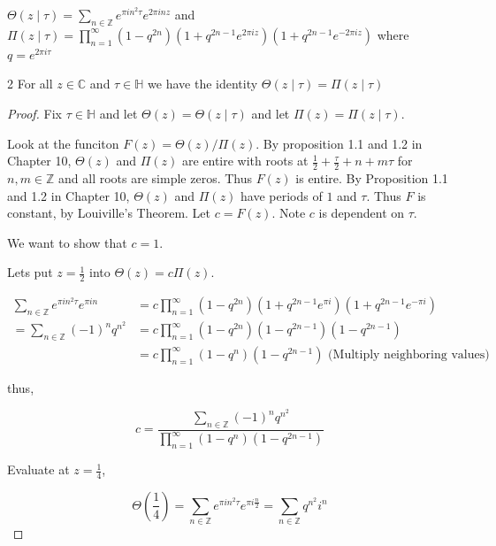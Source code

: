 \documentclass{article}
\newcommand{\C}{\mathbb{C}}
\newcommand{\Z}{\mathbb{Z}}
\begin{document}
\bigskip

$\Theta(z \mid \tau) = \sum_{n \in \Z} e^{\pi i n^2 \tau} e^{2\pi i n z}$ and $\Pi(z \mid \tau) = \prod_{n = 1}^{\infty}(1 - q^{2n})(1 + q^{2n - 1}e^{2 \pi i z})(1 + q^{2 n - 1}e^{-2 \pi i z})$ where $q = e^{2 \pi i \tau}$ 

\begin{claim}{2}\label{Claim 2.}
    For all $z \in \C$ and $\tau \in \mathbb{H}$ we have the identity $\Theta(z \mid \tau) = \Pi(z \mid \tau)$   
\end{claim}
\begin{proof}
    Fix $\tau \in \mathbb{H}$ and let $\Theta(z) = \Theta(z \mid \tau)$ and let $\Pi(z) = \Pi(z \mid \tau)$.

    Look at the funciton $F(z) = \Theta(z) / \Pi(z)$. By proposition 1.1 and 1.2 in Chapter 10, $\Theta(z)$ and $\Pi(z)$ are entire with roots at $\frac{1}{2} + \frac{\tau}{2} + n + m \tau$ for $n, m \in \Z$ and all roots are simple zeros. Thus $F(z)$ is entire. By Proposition 1.1 and 1.2 in Chapter 10, $\Theta(z)$ and $\Pi(z)$ have periods of $1$ and $\tau$. Thus $F$ is constant, by Louiville's Theorem. Let $c = F(z)$. Note $c$ is dependent on $\tau$. 
    
    We want to show that $c = 1$.
    
    Lets put $z = \frac{1}{2}$ into $\Theta(z) = c \Pi(z)$. 

    \begin{align*}
        \sum_{n \in \Z} e^{\pi i n^2 \tau} e^{\pi i n} &= c\prod_{n = 1}^{\infty}(1 - q^{2n})(1 + q^{2n - 1}e^{\pi i})(1 + q^{2 n - 1}e^{-\pi i})\\
        =\sum_{n \in \Z} (-1)^n q^{n^2} &=  c\prod_{n = 1}^{\infty}(1 - q^{2n})(1 - q^{2n - 1})(1 - q^{2 n - 1}) \\
        &=c\prod_{n = 1}^{\infty}(1 - q^n)(1 - q^{2 n - 1}) \text{ (Multiply neighboring values)}
    \end{align*}

    thus, 

    \begin{equation*}
        c = \frac{\sum_{n \in \Z} (-1)^n q^{n^2}}{\prod_{n = 1}^{\infty}(1 - q^n)(1 - q^{2 n - 1})}
    \end{equation*} 

    Evaluate at $z = \frac{1}{4}$,  

    \begin{equation*}
        \Theta\left(\frac{1}{4}\right) = \sum_{n \in \Z} e^{\pi i n^2 \tau} e^{\pi i \frac{n}{2}} =\sum_{n \in \Z} q^{n^2} i^n 
    \end{equation*}


\end{proof}
\end{document}
